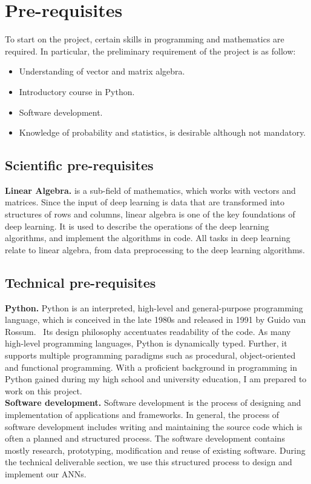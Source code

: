 
\section{Pre-requisites} 

To start on the project, certain skills in programming
and mathematics are required. In particular, the preliminary requirement of
the project is as follow:~\\
\begin{itemize}
        \item Understanding of vector and matrix algebra.
        \item Introductory course in Python.
        \item Software development.
        \item Knowledge of probability and statistics, is desirable although not
          mandatory.
\end{itemize}

\subsection{Scientific pre-requisites}

\textbf{Linear Algebra.} is a sub-field of mathematics, which works with vectors
and matrices. Since the input of deep learning is data that are transformed into
structures of rows and columns, linear algebra is one of the key foundations of
deep learning. It is used to describe the operations of the deep learning
algorithms, and implement the algorithms in code. All tasks in deep learning
relate to linear algebra, from data preprocessing to the deep learning
algorithms.~\cite{Goodfellow-et-al-2016}

\subsection{Technical pre-requisites}

\textbf{Python.} Python is an interpreted, high-level and general-purpose
programming language, which is conceived in the late 1980s and released in 1991
by Guido van Rossum.~\cite{PyRo} Its design philosophy accentuates readability
of the code.  As many high-level programming languages, Python is dynamically
typed. Further, it supports multiple programming paradigms such as procedural,
object-oriented and functional programming. With a proficient background in
programming in Python gained during my high school and university education, I
am prepared to work on this project.\\

\textbf{Software development.} Software development is the process of designing
and implementation of applications and frameworks. In general, the process of
software development includes writing and maintaining the source code which is
often a planned and structured process. The software development contains mostly
research, prototyping, modification and reuse of existing software. During the
technical deliverable section, we use this structured process to design and
implement our ANNs. 
